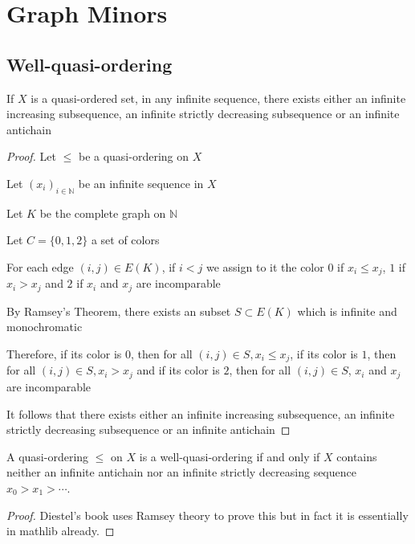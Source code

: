 \chapter{Graph Minors}

\section{Well-quasi-ordering}

\begin{lemma}
  \label{QO_tricolor}   \leanok
  If \(X\) is a quasi-ordered set, in any infinite sequence, there exists either an infinite increasing subsequence, an infinite strictly decreasing subsequence or an infinite antichain
\end{lemma}

\begin{proof}
  Let \(\leq\) be a quasi-ordering on \(X\)

  Let \((x_i)_{i\in\mathbb{N}}\) be an infinite sequence in \(X\)

  Let \(K\) be the complete graph on \(\mathbb{N}\)

  Let \(C=\{0,1,2\}\) a set of colors

  For each edge \((i,j)\in E(K)\), if \(i<j\) we assign to it the color \(0\) if \(x_i\leq x_j\), \(1\) if \(x_i>x_j\) and \(2\) if \(x_i\) and \(x_j\) are incomparable

  By Ramsey's Theorem, there exists an subset \(S\subset E(K)\) which is infinite and monochromatic

  Therefore, if its color is \(0\), then for all \((i,j)\in S, x_i\leq x_j\), if its color is \(1\), then for all \((i,j)\in S, x_i>x_j\) and if its color is \(2\), then for all \((i,j)\in S\), \(x_i\) and \(x_j\) are incomparable

  It follows that there exists either an infinite increasing subsequence, an infinite strictly decreasing subsequence or an infinite antichain
\end{proof}

\begin{proposition}
  \label{WQO_iff}  \leanok \mathlibok
  A quasi-ordering $\leq$ on $X$ is a well-quasi-ordering if and only if $X$
  contains neither an infinite antichain nor an infinite strictly decreasing
  sequence $x_0 > x_1 > \cdots$.
\end{proposition}

\begin{proof}
  \leanok
  Diestel's book uses Ramsey theory to prove this but in fact it is essentially
  in mathlib already.
\end{proof}


